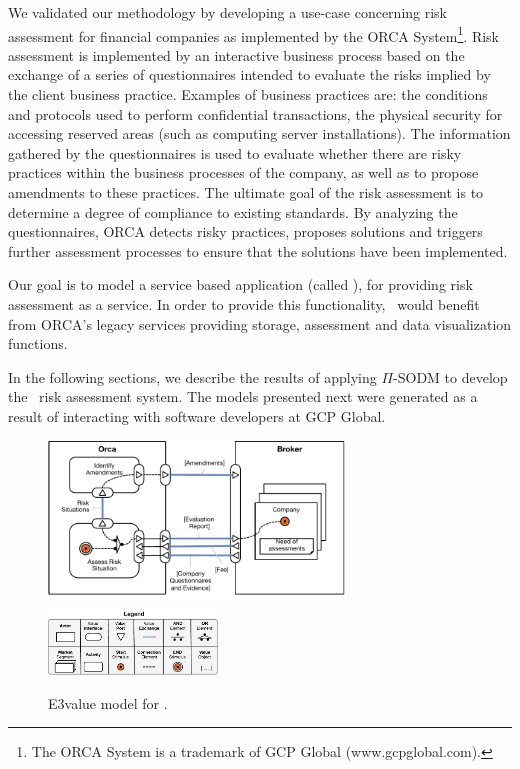 We validated our methodology by developing a use-case concerning risk assessment for financial companies as implemented by the ORCA System\footnote{The ORCA System is a trademark of GCP Global (www.gcpglobal.com).}.
Risk assessment is implemented by an interactive business process based on the exchange of a series of questionnaires intended to evaluate the risks implied by the client business practice.
Examples of business practices are: the conditions and protocols used to perform confidential transactions, the physical security for accessing reserved areas (such as computing server installations).
The information gathered by the questionnaires is used to evaluate whether there are risky practices within the business processes of the company, as well as to propose amendments to these practices.
The ultimate goal of the risk assessment is to determine a degree of compliance to existing standards.
By analyzing the questionnaires, ORCA detects risky practices, proposes solutions and triggers further assessment processes to ensure that the solutions have been implemented.

Our goal is to model a service based application (called \FlyingPig), for providing risk assessment as a service.
In order to provide this functionality, \FlyingPig\ would benefit from ORCA's legacy services providing storage, assessment and data visualization functions.

In the following sections, we describe the results of applying $\Pi$-SODM to develop the \FlyingPig\ risk assessment system.
The models presented next were generated as a result of interacting with software developers at GCP Global.

\begin{figure}
\centering
\includegraphics[width=0.7\textwidth]{figs/3ValueModel.pdf}
\hspace*{5cm}\includegraphics[width=0.4\textwidth]{figs/3ValueKey.pdf}
\caption{E3value model for \FlyingPig.\label{fig:E3valuemodel}}
\end{figure}

